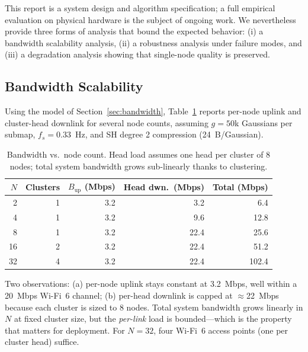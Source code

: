 \label{sec:experiments}

This report is a system design and algorithm specification; a full empirical
evaluation on physical hardware is the subject of ongoing work. We nevertheless
provide three forms of analysis that bound the expected behavior: (i) a
bandwidth scalability analysis, (ii) a robustness analysis under failure
modes, and (iii) a degradation analysis showing that single-node quality is
preserved.

\subsection{Bandwidth Scalability}

Using the model of Section~\ref{sec:bandwidth}, Table~\ref{tab:bw} reports
per-node uplink and cluster-head downlink for several node counts, assuming
$g=50$k Gaussians per submap, $f_s = 0.33$~Hz, and SH degree 2 compression
(24~B/Gaussian).

\begin{table}[t]
  \centering
  \caption{Bandwidth vs.\ node count. Head load assumes one head per cluster of
  8 nodes; total system bandwidth grows sub-linearly thanks to clustering.}
  \label{tab:bw}
  \small
  \begin{tabular}{rrrrr}
    \toprule
    $N$ & Clusters & $B_{\text{up}}$ (Mbps) & Head dwn.\ (Mbps) & Total (Mbps) \\
    \midrule
    2  & 1 & 3.2  & 3.2  & 6.4   \\
    4  & 1 & 3.2  & 9.6  & 12.8  \\
    8  & 1 & 3.2  & 22.4 & 25.6  \\
    16 & 2 & 3.2  & 22.4 & 51.2  \\
    32 & 4 & 3.2  & 22.4 & 102.4 \\
    \bottomrule
  \end{tabular}
\end{table}

Two observations: (a) per-node uplink stays constant at 3.2~Mbps, well within
a 20~Mbps Wi-Fi~6 channel; (b) per-head downlink is capped at $\approx$22~Mbps
because each cluster is sized to 8 nodes. Total system bandwidth grows linearly
in $N$ at fixed cluster size, but the \emph{per-link} load is bounded---which
is the property that matters for deployment. For $N=32$, four Wi-Fi~6 access
points (one per cluster head) suffice.

